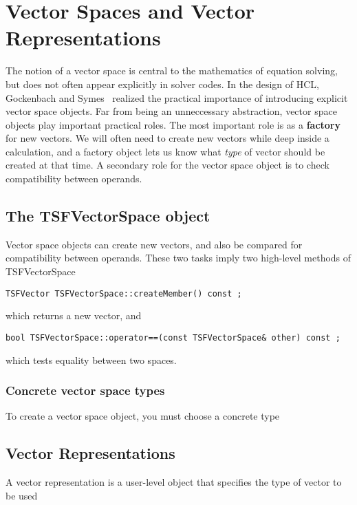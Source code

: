 \chapter{Vector Spaces and Vector Representations}

The notion of a vector space is central to the mathematics of equation solving,
but does not often appear explicitly in solver codes. 
In the design of HCL, Gockenbach and Symes~\cite{GockSymes} realized the practical 
importance of 
introducing explicit vector space objects. Far from being an unneccessary abstraction,
vector space objects play important practical roles. The most important role
is as a {\bf factory} for new vectors. We will often need to create new vectors while
deep inside a calculation, and 
a factory object lets us know what {\it type} of vector should be created at that time.  
A secondary role for the vector space object is to check compatibility between operands.



\section{The TSFVectorSpace object}

Vector space objects can create new vectors, and also be compared for compatibility
between operands. These two tasks imply two high-level methods of TSFVectorSpace
\begin{verbatim}
TSFVector TSFVectorSpace::createMember() const ;
\end{verbatim}
which returns a new vector, and
\begin{verbatim}
bool TSFVectorSpace::operator==(const TSFVectorSpace& other) const ;
\end{verbatim}
which tests equality between two spaces.

\subsection{Concrete vector space types}

To create a vector space object, you must choose a concrete type



\section{Vector Representations}

A vector representation is a user-level object that specifies the type of vector to 
be used




